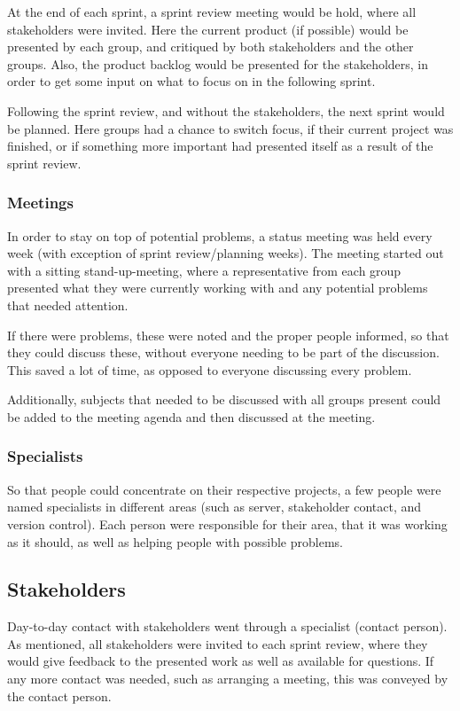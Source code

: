 At the end of each sprint, a sprint review meeting would be hold, where all stakeholders were invited.
Here the current product (if possible) would be presented by each group, and critiqued by both stakeholders and the other groups.
Also, the product backlog would be presented for the stakeholders, in order to get some input on what to focus on in the following sprint.

Following the sprint review, and without the stakeholders, the next sprint would be planned.
Here groups had a chance to switch focus, if their current project was finished, or if something more important had presented itself as a result of the sprint review.

\subsubsection{Meetings}
In order to stay on top of potential problems, a status meeting was held every week (with exception of sprint review/planning weeks).
The meeting started out with a sitting stand-up-meeting, where a representative from each group presented what they were currently working with and any potential problems that needed attention.

If there were problems, these were noted and the proper people informed, so that they could discuss these, without everyone needing to be part of the discussion.
This saved a lot of time, as opposed to everyone discussing every problem.

Additionally, subjects that needed to be discussed with all groups present could be added to the meeting agenda and then discussed at the meeting.

\subsubsection{Specialists}
So that people could concentrate on their respective projects, a few people were named specialists in different areas (such as server, stakeholder contact, and version control).
Each person were responsible for their area, that it was working as it should, as well as helping people with possible problems.

\subsection{Stakeholders}
Day-to-day contact with stakeholders went through a specialist (contact person).
As mentioned, all stakeholders were invited to each sprint review, where they would give feedback to the presented work as well as available for questions.
If any more contact was needed, such as arranging a meeting, this was conveyed by the contact person.

